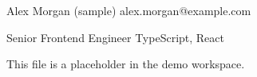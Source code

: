 \documentclass{article}
\begin{document}
Alex Morgan (sample) \quad alex.morgan@example.com

Senior Frontend Engineer \quad TypeScript, React

This file is a placeholder in the demo workspace.
\end{document}
